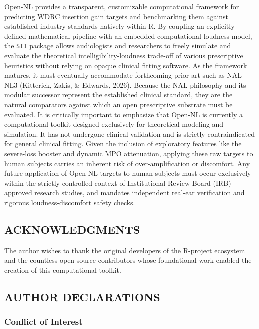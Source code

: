 \documentclass[
  12pt,
]{article}
\begin{document}
Open-NL provides a transparent, customizable computational framework for
predicting WDRC insertion gain targets and benchmarking them against
established industry standards natively within R. By coupling an
explicitly defined mathematical pipeline with an embedded computational
loudness model, the \texttt{SII} package allows audiologists and
researchers to freely simulate and evaluate the theoretical
intelligibility-loudness trade-off of various prescriptive heuristics
without relying on opaque clinical fitting software. As the framework
matures, it must eventually accommodate forthcoming prior art such as
NAL-NL3 (Kitterick, Zakis, \& Edwards, 2026). Because the NAL philosophy
and its modular successor represent the established clinical standard,
they are the natural comparators against which an open prescriptive
substrate must be evaluated. It is critically important to emphasize
that Open-NL is currently a computational toolkit designed exclusively
for theoretical modeling and simulation. It has not undergone clinical
validation and is strictly contraindicated for general clinical fitting.
Given the inclusion of exploratory features like the severe-loss booster
and dynamic MPO attenuation, applying these raw targets to human
subjects carries an inherent risk of over-amplification or discomfort.
Any future application of Open-NL targets to human subjects must occur
exclusively within the strictly controlled context of Institutional
Review Board (IRB) approved research studies, and mandates independent
real-ear verification and rigorous loudness-discomfort safety checks.

\subsection{ACKNOWLEDGMENTS}\label{acknowledgments}

The author wishes to thank the original developers of the R-project
ecosystem and the countless open-source contributors whose foundational
work enabled the creation of this computational toolkit.

\subsection{AUTHOR DECLARATIONS}\label{author-declarations}

\subsubsection{Conflict of Interest}\label{conflict-of-interest}
\end{document}
